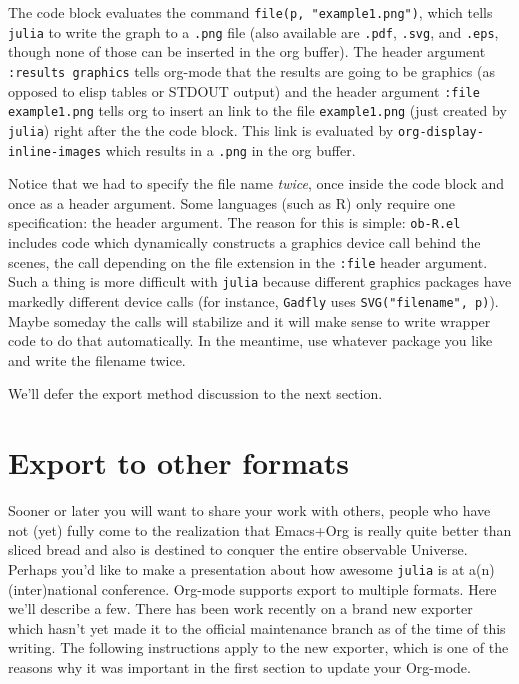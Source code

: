 \documentclass[11pt]{article}
\begin{document}
The code block evaluates the command \texttt{file(p, "example1.png")}, which
tells \texttt{julia} to write the graph to a \texttt{.png} file (also available are
\texttt{.pdf}, \texttt{.svg}, and \texttt{.eps}, though none of those can be inserted in
the org buffer).  The header argument \texttt{:results graphics} tells
org-mode that the results are going to be graphics (as opposed to
elisp tables or STDOUT output) and the header argument \texttt{:file
example1.png} tells org to insert an link to the file \texttt{example1.png}
(just created by \texttt{julia}) right after the the code block.  This link
is evaluated by \texttt{org-display-inline-images} which results in a \texttt{.png}
in the org buffer.

Notice that we had to specify the file name \emph{twice}, once inside the
code block and once as a header argument.  Some languages (such as R)
only require one specification: the header argument.  The reason for
this is simple: \texttt{ob-R.el} includes code which dynamically constructs a
graphics device call behind the scenes, the call depending on the file
extension in the \texttt{:file} header argument.  Such a thing is more
difficult with \texttt{julia} because different graphics packages have
markedly different device calls (for instance, \texttt{Gadfly} uses
\texttt{SVG("filename", p)}).  Maybe someday the calls will stabilize and it
will make sense to write wrapper code to do that automatically.  In
the meantime, use whatever package you like and write the filename
twice.

We'll defer the export method discussion to the next section.
\section[Export to other formats]{Export to other formats}
\label{sec-4}

Sooner or later you will want to share your work with others, people
who have not (yet) fully come to the realization that Emacs+Org is
really quite better than sliced bread and also is destined to conquer
the entire observable Universe.  Perhaps you'd like to make a
presentation about how awesome \texttt{julia} is at a(n) (inter)national
conference. Org-mode supports export to multiple formats.  Here we'll
describe a few.  There has been work recently on a brand new exporter
which hasn't yet made it to the official maintenance branch as of the
time of this writing.  The following instructions apply to the new
exporter, which is one of the reasons why it was important in the
first section to update your Org-mode.
\end{document}

